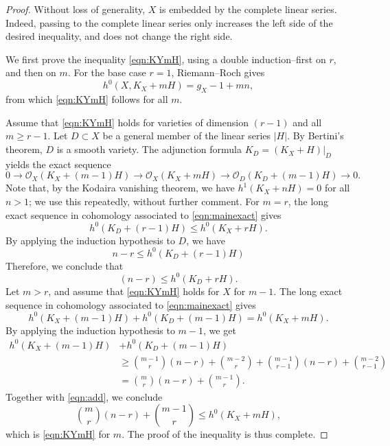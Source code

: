 \documentclass[11pt,reqno]{amsart}
\theoremstyle{plain}
\theoremstyle{definition}
\theoremstyle{remark}
\numberwithin{equation}{section}
\renewcommand{\to}{{\longrightarrow}}
\numberwithin{equation}{section}
\renewcommand{\O}{\mathcal O}
\begin{document}
\begin{proof}
  Without loss of generality, $X$ is embedded by the complete linear series.
  Indeed, passing to the complete linear series only increases the left side of the desired inequality, and does not change the right side.
  
  We first prove the inequality \eqref{eqn:KYmH}, using a double induction--first on $r$, and then on $m$.
  For the base case $r = 1$, Riemann--Roch gives
  \begin{equation}\label{eqn:r1}
    h^0(X, K_X + mH) = g_X - 1 + mn,
  \end{equation}
  from which \eqref{eqn:KYmH} follows for all $m$.

  Assume that \eqref{eqn:KYmH} holds for varieties of dimension $(r-1)$ and all $m \geq r-1$.
  Let $D \subset X$ be a general member of the linear series $|H|$.
  By Bertini's theorem, $D$ is a smooth variety.
  The adjunction formula $K_D = (K_X + H)|_D$ yields the exact sequence
  \begin{equation}\label{eqn:mainexact}
    0 \to \O_X(K_X + (m-1)H) \to \O_X(K_X + mH) \to \O_D(K_D + (m-1)H) \to 0.
  \end{equation}
  Note that, by the Kodaira vanishing theorem, we have $h^1(K_X + nH) = 0$ for all $n > 1$; we use this repeatedly, without further comment.
  For $m = r$, the long exact sequence in cohomology associated to \eqref{eqn:mainexact} gives
  \[ h^0(K_D + (r-1)H) \leq h^0(K_X + rH).\]
  By applying the induction hypothesis to $D$, we have
  \begin{equation}
    n-r \leq h^0(K_D + (r-1)H)
  \end{equation}
  Therefore, we conclude that
  \begin{equation}
    (n-r) \leq h^0(K_D + rH).
  \end{equation}
  Let $m > r$, and assume that \eqref{eqn:KYmH} holds for $X$ for $m-1$.
  The long exact sequence in cohomology associated to \eqref{eqn:mainexact} gives
  \begin{equation}\label{eqn:add}
    h^0(K_X + (m-1)H) + h^0(K_D + (m-1)H) = h^0(K_X + mH).
  \end{equation}
  By applying the induction hypothesis to $m-1$, we get
  \begin{align*}
    h^0(K_X + (m-1)H) &+ h^0(K_D + (m-1)H)\\
                      &\geq{{m-1} \choose r}(n-r) + {{m-2} \choose {r}} + {{m-1} \choose {r-1}}(n-r) + {{m-2} \choose r-1} \\
                      &={m \choose r} (n-r) + {{m-1} \choose r}.
  \end{align*}
  Together with \eqref{eqn:add}, we conclude 
  \begin{equation}
    {m \choose r} (n-r) + {{m-1} \choose r} \leq h^0(K_X + mH), 
  \end{equation}
  which is \eqref{eqn:KYmH} for $m$.
  The proof of the inequality is thus complete.


\end{proof}
\end{document}
